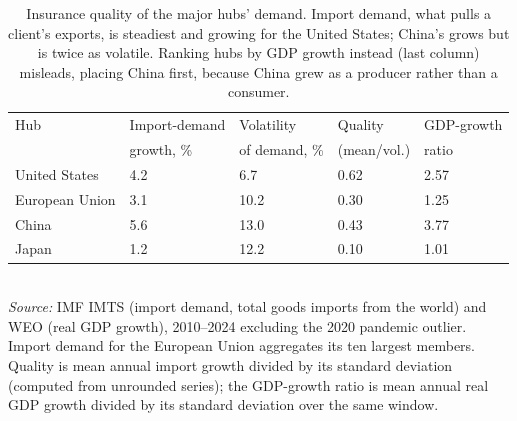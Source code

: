 \begin{table}[H]
\centering\small
\caption{Insurance quality of the major hubs' demand. Import demand, what pulls a client's exports, is steadiest and growing for the United States; China's grows but is twice as volatile. Ranking hubs by GDP growth instead (last column) misleads, placing China first, because China grew as a producer rather than a consumer.}
\label{tab:partnerquality}
\begin{tabularx}{\textwidth}{@{}lYYYY@{}}
\toprule
Hub & Import-demand & Volatility & Quality & GDP-growth \\
 & growth, \% & of demand, \% & (mean/vol.) & ratio \\ \midrule
United States & 4.2 & 6.7 & 0.62 & 2.57 \\
European Union & 3.1 & 10.2 & 0.30 & 1.25 \\
China & 5.6 & 13.0 & 0.43 & 3.77 \\
Japan & 1.2 & 12.2 & 0.10 & 1.01 \\
\bottomrule
\end{tabularx}
\\[2pt]\footnotesize{\emph{Source:} IMF IMTS (import demand, total goods imports from the world) and WEO (real GDP growth), 2010--2024 excluding the 2020 pandemic outlier. Import demand for the European Union aggregates its ten largest members. Quality is mean annual import growth divided by its standard deviation (computed from unrounded series); the GDP-growth ratio is mean annual real GDP growth divided by its standard deviation over the same window.}
\end{table}
